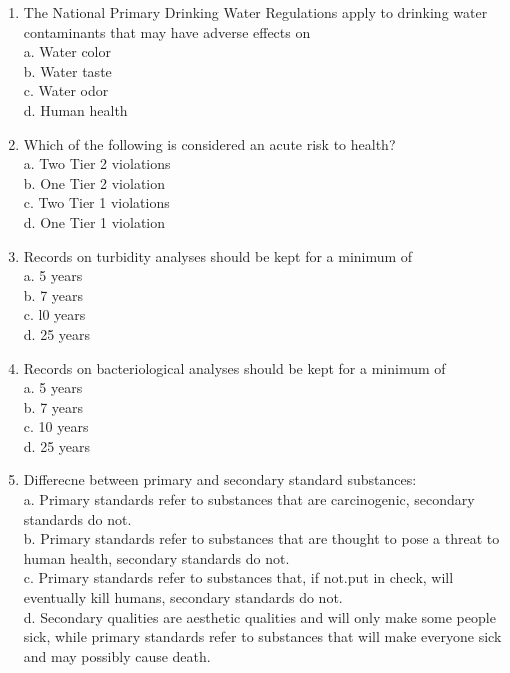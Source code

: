 \documentclass[10pt]{article}
\begin{document}
\begin{enumerate}
\item The National Primary Drinking Water Regulations apply to drinking water contaminants that may have adverse effects on\\
a.	Water color\\
b.	Water taste\\
c.	Water odor\\
d.	Human health\\

\item Which of the following is considered an acute risk to health?\\
a.	Two Tier 2 violations\\
b.	One Tier 2 violation\\
c.	Two Tier 1 violations\\
d.	One Tier 1 violation\\

\item Records on turbidity analyses should be kept for a minimum of\\
a.	5 years\\
b.	7 years\\
c.	l0 years\\
d.	25 years\\

\item Records on bacteriological analyses should be kept for a minimum of\\
a.	5 years\\
b.	7 years\\
c.	10 years\\
d.	25 years\\

\item Differecne between primary and secondary standard substances:\\
a.	Primary standards refer to substances that are carcinogenic, secondary standards do not.\\
b.	Primary standards refer to substances that are thought to pose a threat to human health, secondary standards do not.\\
c.	Primary standards refer to substances that, if not.put in check, will eventually kill humans, secondary standards do not.\\
d.	Secondary qualities are aesthetic qualities and will only make some people sick, while primary standards refer to substances that will make everyone sick and may possibly cause death.\\


\end{enumerate}
\end{document}
